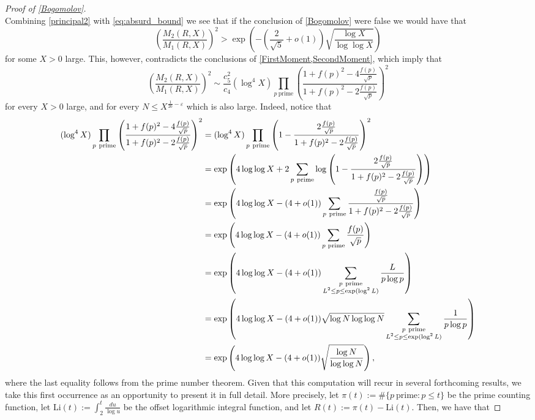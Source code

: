 \documentclass[10pt,a4paper]{amsart}
\theoremstyle{plain}
\theoremstyle{definition}
\theoremstyle{remark}
\begin{document}
\begin{proof}[Proof of \cref{Bogomolov}]
\begin{equation}
\end{equation}
Combining \eqref{principal2} with \eqref{eq:absurd_bound} we see that if the conclusion of \cref{Bogomolov} were false we would have that
\begin{equation}
    \label{eq:absurd_bound2}
    \left(\frac{M_2(R,X)}{M_1(R,X)}\right)^2 > \exp\left(- \left(\frac{2}{\sqrt{5}}+o(1)\right)\sqrt{\frac{\log X}{\log\log X}}\right)
\end{equation}
for some $X > 0$ large.
This, however, contradicts the conclusions of \cref{FirstMoment,SecondMoment}, which imply that
\[
    \left( \frac{M_2(R,X)}{M_1(R,X)} \right)^2 \sim \frac{c_5^2}{c_4}(\log^4 X)\prod_{p \ \text{prime}}\left(\frac{1+f(p)^2-4\frac{f(p)}{\sqrt{p}}}{1+f(p)^2-2\frac{f(p)}{\sqrt{p}}}\right)^2
\]
for every $X > 0$ large, and for every $N \leq X^{\frac{1}{20} - \varepsilon}$ which is also large.
Indeed, notice that
\begin{equation} \label{eq:main_theorem_from_moments}
\begin{split}\raisetag{-35ex}
(\log^4 X)\prod_{p \ \text{prime}}\left(\frac{1+f(p)^2-4\frac{f(p)}{\sqrt{p}}}{1+f(p)^2-2\frac{f(p)}{\sqrt{p}}}\right)^2
&=(\log^4 X)\prod_{p \ \text{prime}} \left(1-\frac{2\frac{f(p)}{\sqrt{p}}}{1+f(p)^2-2\frac{f(p)}{\sqrt{p}}}\right)^2\\
&=\exp\left( 4 \log\log X + 2 \sum_{p \ \text{prime}} \log\left( 1 - \frac{2 \frac{f(p)}{\sqrt{p}}}{1+f(p)^2-2\frac{f(p)}{\sqrt{p}}} \right) \right) \\
&= \exp\left( 4 \log\log X - (4+o(1)) \sum_{p \ \text{prime}} \frac{\frac{f(p)}{\sqrt{p}}}{1+f(p)^2-2\frac{f(p)}{\sqrt{p}}} \right) \\
&=\exp\left(4 \log\log X -(4+o(1))\sum_{p \text{ prime}}\frac{f(p)}{\sqrt{p}}\right)\\
&=
\exp \left(4 \log\log X -(4+o(1))\sum_{\substack{p \ \text{prime} \\ L^2\leq p\leq \exp(\log^2 L)}}\frac{L}{p\log p}\right)\\
&=
\exp \left(4 \log\log X -(4+o(1))\sqrt{\log N\log\log N}\sum_{\substack{p \ \text{prime} \\ L^2\leq p\leq \exp(\log^2 L)}}\frac{1}{p\log p}\right)\\
&=\exp\left(4 \log\log X -(4+o(1))\sqrt{\frac{\log N}{\log\log N}}\right), 
\end{split}
\end{equation}
where the last equality follows from the prime number theorem.
Given that this computation will recur in several forthcoming results, we take this first occurrence as an opportunity to present it in full detail. More precisely, let $\pi(t) := \#\{ p \ \text{prime} \colon p \leq t \}$ be the prime counting function, let $\mathrm{Li}(t) := \int_2^{t} \frac{du}{\log u}$ be the offset logarithmic integral function, and let $R(t) := \pi(t) - \mathrm{Li}(t)$. Then, we have that

\end{proof}
\end{document}
